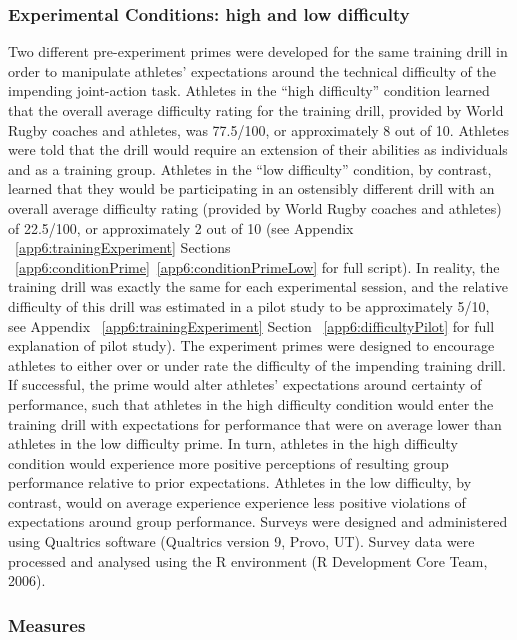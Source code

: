 \subsubsection{Experimental Conditions: high and low difficulty}
Two different pre-experiment primes were developed for the same training drill in order to manipulate athletes’ expectations around the technical difficulty of the impending joint-action task.  Athletes in the ``high difficulty'' condition learned that the overall average difficulty rating for the training drill, provided by World Rugby coaches and athletes, was 77.5/100, or approximately 8 out of 10.  Athletes were told that the drill would require an extension of their abilities as individuals and as a training group.  Athletes in the ``low difficulty'' condition, by contrast, learned that they would be participating in an ostensibly different drill with an overall average difficulty rating (provided by World Rugby coaches and athletes) of 22.5/100, or approximately 2 out of 10 (see Appendix ~\ref{app6:trainingExperiment} Sections ~\ref{app6:conditionPrime}\nobreakdash~\ref{app6:conditionPrimeLow} for full script). In reality, the training drill was exactly the same for each experimental session, and the relative difficulty of this drill was estimated in a pilot study to be approximately 5/10, see Appendix ~\ref{app6:trainingExperiment} Section ~\ref{app6:difficultyPilot} for full explanation of pilot study).  The experiment primes were designed to encourage athletes to either over or under rate the difficulty of the impending training drill. If successful, the prime would alter athletes' expectations around certainty of performance, such that athletes in the high difficulty condition would enter the training drill with expectations for performance that were on average lower than athletes in the low difficulty prime. In turn, athletes in the high difficulty condition would experience more positive perceptions of resulting group performance relative to prior expectations.  Athletes in the low difficulty, by contrast, would on average experience experience less positive violations of expectations around group performance.  Surveys were designed and administered using Qualtrics software (Qualtrics version 9, Provo, UT). Survey data were processed and analysed using the R environment (R Development Core Team, 2006).


\subsubsection{Measures}



